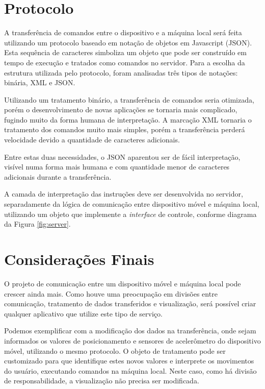 \documentclass{article}
\begin{document}
\section{Protocolo}
\label{sec:protocolo}

A transferência de comandos entre o dispositivo e a máquina local será feita
utilizando um protocolo baseado em notação de objetos em Javascript (JSON). Esta
sequência de caracteres simboliza um objeto que pode ser construído em tempo de
execução e tratados como comandos no servidor. Para a escolha da estrutura
utilizada pelo protocolo, foram analisadas três tipos de notações: binária, XML
e JSON.

Utilizando um tratamento binário, a transferência de comandos seria otimizada,
porém o desenvolvimento de novas aplicações se tornaria mais complicado, fugindo
muito da forma humana de interpretação. A marcação XML tornaria o tratamento
dos comandos muito mais simples, porém a transferência perderá velocidade devido
a quantidade de caracteres adicionais.

Entre estas duas necessidades, o JSON aparentou ser de fácil interpretação,
visível numa forma mais humana e com quantidade menor de caracteres adicionais
durante a transferência.

A camada de interpretação das instruções deve ser desenvolvida no servidor,
separadamente da lógica de comunicação entre dispositivo móvel e máquina local,
utilizando um objeto que implemente a \emph{interface} de controle, conforme
diagrama da Figura \ref{fig:server}.

\section{Considerações Finais}
\label{sec:finais}

O projeto de comunicação entre um dispositivo móvel e máquina local pode crescer
ainda mais. Como houve uma preocupação em divisões entre comunicação, tratamento
de dados transferidos e visualização, será possível criar qualquer aplicativo
que utilize este tipo de serviço.

Podemos exemplificar com a modificação dos dados na transferência, onde sejam
informados os valores de posicionamento e sensores de acelerômetro do
dispositivo móvel, utilizando o mesmo protocolo. O objeto de tratamento pode ser
customizado para que identifique estes novos valores e interprete os movimentos
do usuário, executando comandos na máquina local. Neste caso, como há divisão de
responsabilidade, a visualização não precisa ser modificada.
\end{document}
